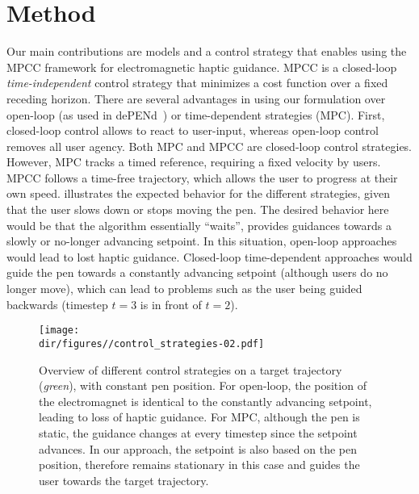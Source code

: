 \section{Method}
Our main contributions are models and a control strategy that enables using the MPCC framework \cite{lam2013model} for electromagnetic haptic guidance.
MPCC is a closed-loop \emph{time-independent} control strategy that minimizes a cost function over a fixed receding horizon. 
There are several advantages in using our formulation over open-loop (as used in dePENd~\cite{yamaoka2013depend}) or time-dependent strategies (\eg MPC). 
%
First, closed-loop control allows to react to user-input, whereas open-loop control removes all user agency. 
Both MPC and MPCC are closed-loop control strategies. 
However, MPC tracks a timed reference, requiring a fixed velocity by users. 
MPCC follows a time-free trajectory, which allows the user to progress at their own speed. 
 illustrates the expected behavior for the different strategies, given that the user slows down or stops moving the pen. 
The desired behavior here would be that the algorithm essentially ``waits'', \ie provides guidances towards a slowly or no-longer advancing setpoint.
In this situation, open-loop approaches would lead to lost haptic guidance. 
Closed-loop time-dependent approaches would guide the pen towards a constantly advancing setpoint (although users do no longer move), which can lead to problems such as the user being guided backwards (\eg timestep $t=3$ is in front of $t=2$).

\begin{figure}[!t]
    \centering
    \vspace{-.5em}
    \texttt{[image: \\dir/figures//control\_strategies-02.pdf]}
    \caption{
    Overview of different control strategies on a target trajectory (\textit{green}), with constant pen position.
    For open-loop, the position of the electromagnet is identical to the constantly advancing setpoint, leading to loss of haptic guidance.
    For MPC, although the pen is static, the guidance changes at every timestep since the setpoint advances.
    In our approach, the setpoint is also based on the pen position, therefore remains stationary in this case and guides the user towards the target trajectory.}
    \label{fig:control}
    \vspace{-1em}
\end{figure}

